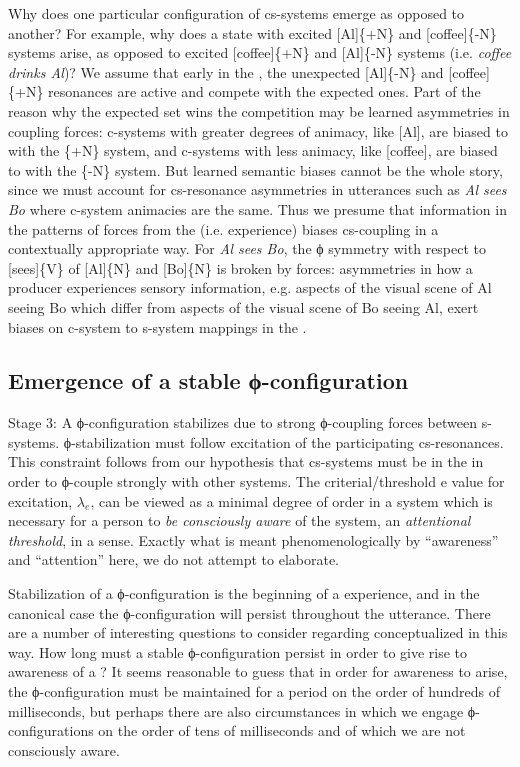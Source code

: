 Why does one particular configuration of cs-systems emerge as opposed to another? For example, why does a state with excited [Al]\{+N\} and [coffee]\{-N\} systems arise, as opposed to excited [coffee]\{+N\} and [Al]\{-N\} systems (i.e. \textit{coffee drinks Al})? We assume that early in the , the unexpected [Al]\{-N\} and [coffee]\{+N\} resonances are active and compete with the expected ones. Part of the reason why the expected set wins the competition may be learned asymmetries in coupling forces: c-systems with greater degrees of animacy, like [Al], are biased to  with the \{+N\} system, and c-systems with less animacy, like [coffee], are biased to  with the \{-N\} system. But learned semantic biases cannot be the whole story, since we must account for cs-resonance asymmetries in utterances such as \textit{Al sees Bo} where c-system animacies are the same. Thus we presume that information in the patterns of forces from the  (i.e.  experience) biases cs-coupling in a contextually appropriate way. For \textit{Al sees Bo}, the ϕ symmetry with respect to [sees]\{V\} of [Al]\{N\} and [Bo]\{N\} is broken by  forces: asymmetries in how a producer experiences sensory information, e.g. aspects of the visual scene of Al seeing Bo which differ from aspects of the visual scene of Bo seeing Al, exert biases on c-system to s-system mappings in the .

\subsection{Emergence of a stable ϕ-configuration}

Stage 3: A ϕ-configuration stabilizes due to strong ϕ{}-coupling forces between s-systems. ϕ{}-stabilization must follow excitation of the participating cs-resonances. This constraint follows from our hypothesis that cs-systems must be in the  in order to ϕ-couple strongly with other systems. The criterial/threshold e value for excitation, $\lambda_{e}$, can be viewed as a minimal degree of order in a system which is necessary for a person to \textit{be consciously aware} of the system, an \textit{attentional threshold}, in a sense. Exactly what is meant phenomenologically by “awareness” and “attention” here, we do not attempt to elaborate. 

Stabilization of a ϕ-configuration is the beginning of a  experience, and in the canonical case the ϕ-configuration will persist throughout the utterance. There are a number of interesting questions to consider regarding  conceptualized in this way. How long must a stable ϕ-configuration persist in order to give rise to awareness of a ? It seems reasonable to guess that in order for awareness to arise, the ϕ-configuration must be maintained for a period on the order of hundreds of milliseconds, but perhaps there are also circumstances in which we engage ϕ-configurations on the order of tens of milliseconds and of which we are not consciously aware.

